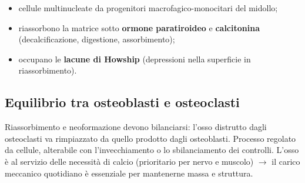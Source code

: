 \begin{itemize}
  \item cellule multinucleate da progenitori macrofagico-monocitari del midollo;
  \item riassorbono la matrice sotto \textbf{ormone paratiroideo} e \textbf{calcitonina}
    (decalcificazione, digestione, assorbimento);
  \item occupano le \textbf{lacune di Howship} (depressioni nella superficie in riassorbimento).
\end{itemize}

\subsection{Equilibrio tra osteoblasti e osteoclasti}
Riassorbimento e neoformazione devono bilanciarsi: l'osso distrutto dagli osteoclasti va rimpiazzato
da quello prodotto dagli osteoblasti. Processo regolato da cellule, alterabile con l'invecchiamento
o lo sbilanciamento dei controlli. L'osso è al servizio delle necessità di calcio (prioritario per
nervo e muscolo) $\rightarrow$ il carico meccanico quotidiano è essenziale per mantenerne massa e
struttura.

